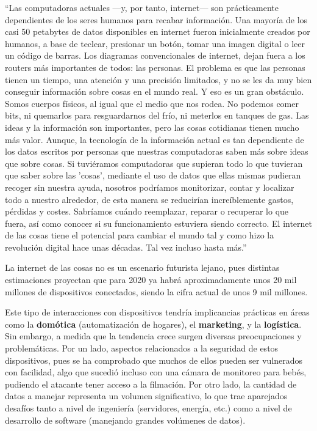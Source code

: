 ``Las computadoras actuales —y, por tanto, internet— son prácticamente
dependientes de los seres humanos para recabar información. Una mayoría de los
casi 50 petabytes de datos disponibles en internet fueron inicialmente creados
por humanos, a base de teclear, presionar un botón, tomar una imagen digital o
leer un código de barras. Los diagramas convencionales de internet, dejan
fuera a los routers más importantes de todos: las personas. El problema es que
las personas tienen un tiempo, una atención y una precisión limitados, y no se
les da muy bien conseguir información sobre cosas en el mundo real. Y eso es un
gran obstáculo. Somos cuerpos físicos, al igual que el medio que nos rodea. No
podemos comer bits, ni quemarlos para resguardarnos del frío, ni meterlos en
tanques de gas. Las ideas y la información son importantes, pero las cosas
cotidianas tienen mucho más valor. Aunque, la tecnología de la información actual
es tan dependiente de los datos escritos por personas que nuestras computadoras
saben más sobre ideas que sobre cosas. Si tuviéramos computadoras que supieran
todo lo que tuvieran que saber sobre las 'cosas', mediante el uso de datos que
ellas mismas pudieran recoger sin nuestra ayuda, nosotros podríamos monitorizar,
contar y localizar todo a nuestro alrededor, de esta manera se reducirían
increíblemente gastos, pérdidas y costes. Sabríamos cuándo reemplazar, reparar o
recuperar lo que fuera, así como conocer si su funcionamiento estuviera siendo
correcto. El internet de las cosas tiene el potencial para cambiar el mundo tal
y como hizo la revolución digital hace unas décadas. Tal vez incluso hasta más.''
\textcite{ashton_2009}

La internet de las cosas no es un escenario futurista lejano, pues distintas
estimaciones proyectan que para 2020 ya habrá aproximadamente unos 20 mil
millones de dispositivos conectados, siendo la cifra actual de unos 9 mil millones.
\autocite{gartner_2017}

Este tipo de interacciones con dispositivos tendría implicancias prácticas
en áreas como la \textbf{domótica} (automatización de hogares), el \textbf{marketing},
y la \textbf{logística}. Sin embargo, a medida que la tendencia crece surgen
diversas preocupaciones y problemáticas. Por un lado, aspectos relacionados a
la seguridad de estos dispositivos, pues se ha comprobado que muchos de ellos
pueden ser vulnerados con facilidad, algo que sucedió incluso con una cámara de
monitoreo para bebés, pudiendo el atacante tener acceso a la filmación. Por otro
lado, la cantidad de datos a manejar representa un volumen significativo, lo que
trae aparejados desafíos tanto a nivel de ingeniería (servidores, energía, etc.)
como a nivel de desarrollo de software (manejando grandes volúmenes de datos).

